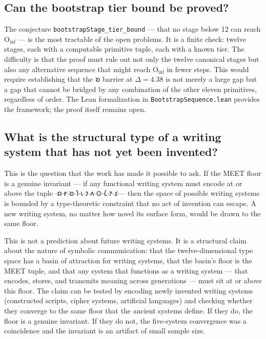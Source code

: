 \documentclass[12pt,a4paper]{article}
\begin{document}
\subsection{Can the bootstrap tier bound be proved?}

The conjecture \texttt{bootstrapStage\_tier\_bound} --- that no stage below 12 can reach $\text{O}_\text{inf}$ --- is the most tractable of the open problems. It is a finite check: twelve stages, each with a computable primitive tuple, each with a known tier. The difficulty is that the proof must rule out not only the twelve canonical stages but also any alternative sequence that might reach $\text{O}_\text{inf}$ in fewer steps. This would require establishing that the $\text{𐑹}$ barrier at $\Delta = 4.38$ is not merely a large gap but a gap that cannot be bridged by any combination of the other eleven primitives, regardless of order. The Lean formalization in \texttt{BootstrapSequence.lean} provides the framework; the proof itself remains open.

\subsection{What is the structural type of a writing system that has not yet been invented?}

This is the question that the work has made it possible to ask. If the MEET floor is a genuine invariant --- if any functional writing system must encode at or above the tuple $\cdot$𐑸$\cdot$𐑾$\cdot$𐑹$\cdot$𐑐$\cdot$𐑧$\cdot$𐑲$\cdot$𐑵$\cdot$⊙$\cdot$𐑖$\cdot$𐑳$\cdot$𐑭\rangle --- then the space of possible writing systems is bounded by a type-theoretic constraint that no act of invention can escape. A new writing system, no matter how novel its surface form, would be drawn to the same floor.

This is not a prediction about future writing systems. It is a structural claim about the nature of symbolic communication: that the twelve-dimensional type space has a basin of attraction for writing systems, that the basin's floor is the MEET tuple, and that any system that functions as a writing system --- that encodes, stores, and transmits meaning across generations --- must sit at or above this floor. The claim can be tested by encoding newly invented writing systems (constructed scripts, cipher systems, artificial languages) and checking whether they converge to the same floor that the ancient systems define. If they do, the floor is a genuine invariant. If they do not, the five-system convergence was a coincidence and the invariant is an artifact of small sample size.
\end{document}
